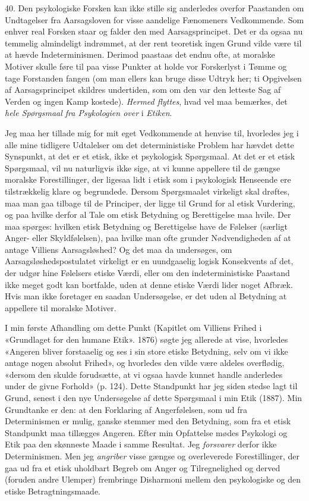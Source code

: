 \documentclass[12pt,a4paper,openany]{book}
\newcommand{\opage}[1]{\marginnote{\footnotesize\textit{[#1]}}}
\begin{document}
40. Den psykologiske Forsken kan ikke stille sig anderledes overfor Paastanden
om Undtagelser fra Aarsagsloven for visse aandelige Fænomeners Vedkommende. Som
enhver real Forsken staar og falder den med Aarsagsprincipet. Det er da ogsaa
nu temmelig almindeligt indrømmet, at der rent teoretisk ingen Grund vilde være
til at hævde Indeterminismen. Derimod paastaas det endnu ofte, at moralske
Motiver skulle føre til paa visse Punkter at holde vor Forskerlyst i Tømme og
tage Forstanden fangen (om man ellers kan bruge disse Udtryk her; ti Opgivelsen
af Aarsagsprincipet skildres undertiden, som om den var den letteste Sag af
Verden og ingen Kamp kostede). \emph{Hermed flyttes}, hvad vel maa bemærkes,
det \emph{hele Spørgsmaal fra Psykologien over} i \emph{Etiken}.

Jeg maa her tillade mig for mit eget Vedkommende at henvise til, hvorledes jeg
i alle mine tidligere Udtalelser om det deterministiske Problem har hævdet
dette Synspunkt, at det er et etisk, ikke et psykologisk Spørgsmaal. At det er
et etisk Spørgsmaal, vil nu naturligvis ikke sige, at vi kunne appellere til de
gængse moralske Forestillinger, der ligesaa lidt i etisk som i psykologisk
Henseende ere tilstrækkelig klare og begrundede. Dersom Spørgsmaalet virkeligt
skal drøftes, maa man gaa tilbage til de Principer, der ligge til Grund for al
etisk Vurdering, og paa hvilke derfor al Tale om etisk Betydning og
\setcounter{footnote}{0}%
\opage{97}Berettigelse maa hvile. Der maa spørges: hvilken etisk Betydning og
Berettigelse have de Følelser (særligt Anger- eller Skyldfølelsen), paa hvilke
man ofte grunder Nødvendigheden af at antage Villiens Aarsagsløshed? Og det maa
da undersøges, om Aarsagsløshedspostulatet virkeligt er en uundgaaelig logisk
Konsekvents af det, der udgør hine Følelsers etiske Værdi, eller om den
indeterministiske Paastand ikke meget godt kan bortfalde, uden at denne etiske
Værdi lider noget Afbræk. Hvis man ikke foretager en saadan Undersøgelse, er
det uden al Betydning at appellere til moralske Motiver.

I min første Afhandling om dette Punkt (Kapitlet om Villiens Frihed i
«Grundlaget for den humane Etik». 1876) søgte jeg allerede at vise, hvorledes
«Angeren bliver forstaaelig og ses i sin store etiske Betydning, selv om vi
ikke antage nogen absolut Frihed», og hvorledes den vilde være aldeles
overflødig, «dersom den skulde forudsætte, at vi ogsaa havde kunnet handle
anderledes under de givne Forhold» (p. 124). Dette Standpunkt har jeg siden
stedse lagt til Grund, senest i den nye Undersøgelse af dette Spørgsmaal i min
Etik (1887). Min Grundtanke er den: at den Forklaring af Angerfølelsen, som ud
fra Determinismen er mulig, ganske stemmer med den Betydning, som fra et etisk
Standpunkt maa tillægges Angeren. Efter min Opfattelse mødes Psykologi og Etik
paa den skønneste Maade i samme Resultat. Jeg \emph{forsvarer} derfor ikke
Determinismen. Men jeg \emph{angriber} visse gængse og overleverede
Forestillinger, der gaa ud fra et etisk uholdbart Begreb om Anger og
Tilregnelighed og derved (foruden andre Ulemper) frembringe Disharmoni mellem
den psykologiske og den etiske Betragtningsmaade.
\end{document}
